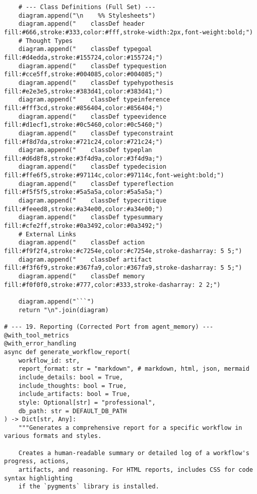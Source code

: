 \documentclass[12pt,a4paper]{article}
\begin{document}
\begin{pageablecode}
\begin{verbatim}
    # --- Class Definitions (Full Set) ---
    diagram.append("\n    %% Stylesheets")
    diagram.append("    classDef header fill:#666,stroke:#333,color:#fff,stroke-width:2px,font-weight:bold;")
    # Thought Types
    diagram.append("    classDef typegoal fill:#d4edda,stroke:#155724,color:#155724;")
    diagram.append("    classDef typequestion fill:#cce5ff,stroke:#004085,color:#004085;")
    diagram.append("    classDef typehypothesis fill:#e2e3e5,stroke:#383d41,color:#383d41;")
    diagram.append("    classDef typeinference fill:#fff3cd,stroke:#856404,color:#856404;")
    diagram.append("    classDef typeevidence fill:#d1ecf1,stroke:#0c5460,color:#0c5460;")
    diagram.append("    classDef typeconstraint fill:#f8d7da,stroke:#721c24,color:#721c24;")
    diagram.append("    classDef typeplan fill:#d6d8f8,stroke:#3f4d9a,color:#3f4d9a;")
    diagram.append("    classDef typedecision fill:#ffe6f5,stroke:#97114c,color:#97114c,font-weight:bold;")
    diagram.append("    classDef typereflection fill:#f5f5f5,stroke:#5a5a5a,color:#5a5a5a;")
    diagram.append("    classDef typecritique fill:#feeed8,stroke:#a34e00,color:#a34e00;")
    diagram.append("    classDef typesummary fill:#cfe2ff,stroke:#0a3492,color:#0a3492;")
    # External Links
    diagram.append("    classDef action fill:#f9f2f4,stroke:#c7254e,color:#c7254e,stroke-dasharray: 5 5;")
    diagram.append("    classDef artifact fill:#f3f6f9,stroke:#367fa9,color:#367fa9,stroke-dasharray: 5 5;")
    diagram.append("    classDef memory fill:#f0f0f0,stroke:#777,color:#333,stroke-dasharray: 2 2;")

    diagram.append("```")
    return "\n".join(diagram)

# --- 19. Reporting (Corrected Port from agent_memory) ---
@with_tool_metrics
@with_error_handling
async def generate_workflow_report(
    workflow_id: str,
    report_format: str = "markdown", # markdown, html, json, mermaid
    include_details: bool = True,
    include_thoughts: bool = True,
    include_artifacts: bool = True,
    style: Optional[str] = "professional",
    db_path: str = DEFAULT_DB_PATH
) -> Dict[str, Any]:
    """Generates a comprehensive report for a specific workflow in various formats and styles.

    Creates a human-readable summary or detailed log of a workflow's progress, actions,
    artifacts, and reasoning. For HTML reports, includes CSS for code syntax highlighting
    if the `pygments` library is installed.


\end{verbatim}
\end{pageablecode}
\end{document}
